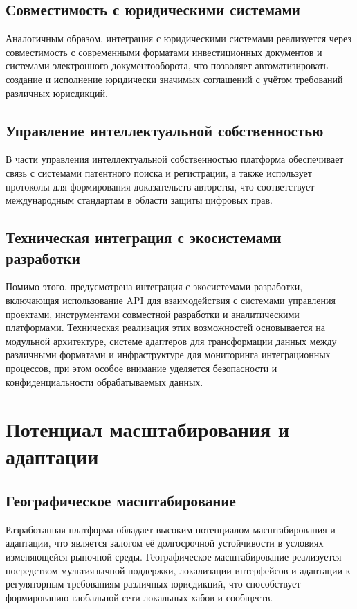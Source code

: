 \documentclass[
    candidate, %
    subf, %
    dotsinheaders=false,
]{disser}
\begin{document}
\subsection{Совместимость с юридическими системами}
Аналогичным образом, интеграция с юридическими системами реализуется через совместимость с современными форматами инвестиционных документов и системами электронного документооборота, что позволяет автоматизировать создание и исполнение юридически значимых соглашений с учётом требований различных юрисдикций.

\subsection{Управление интеллектуальной собственностью}
В части управления интеллектуальной собственностью платформа обеспечивает связь с системами патентного поиска и регистрации, а также использует протоколы для формирования доказательств авторства, что соответствует международным стандартам в области защиты цифровых прав.

\subsection{Техническая интеграция с экосистемами разработки}
Помимо этого, предусмотрена интеграция с экосистемами разработки, включающая использование API для взаимодействия с системами управления проектами, инструментами совместной разработки и аналитическими платформами. Техническая реализация этих возможностей основывается на модульной архитектуре, системе адаптеров для трансформации данных между различными форматами и инфраструктуре для мониторинга интеграционных процессов, при этом особое внимание уделяется безопасности и конфиденциальности обрабатываемых данных.

\section{Потенциал масштабирования и адаптации}

\subsection{Географическое масштабирование}
Разработанная платформа обладает высоким потенциалом масштабирования и адаптации, что является залогом её долгосрочной устойчивости в условиях изменяющейся рыночной среды. Географическое масштабирование реализуется посредством мультиязычной поддержки, локализации интерфейсов и адаптации к регуляторным требованиям различных юрисдикций, что способствует формированию глобальной сети локальных хабов и сообществ.
\end{document}
